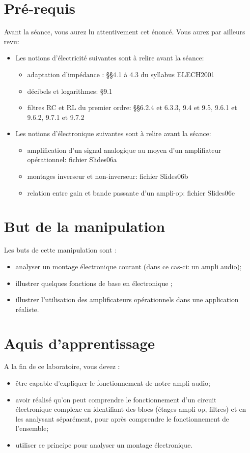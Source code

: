 \section*{Pré-requis}
Avant la séance, vous aurez lu attentivement cet énoncé. Vous aurez par ailleurs revu:\\
\begin{itemize}
\item Les notions d’électricité suivantes sont à relire avant la séance:
	\begin{itemize}
    \item adaptation d’impédance : §§4.1 à 4.3 du syllabus ELECH2001
	\item décibels et logarithmes: §9.1
	\item filtres RC et RL du premier ordre: §§6.2.4 et 6.3.3, 9.4 et 9.5, 9.6.1 et 9.6.2, 9.7.1 et 9.7.2
	\end{itemize}

\item Les notions d’électronique suivantes sont à relire avant la séance:
	\begin{itemize}
    \item amplification d’un signal analogique au moyen d’un amplifiateur opérationnel: fichier Slides06a
	\item montages inverseur et non-inverseur: fichier Slides06b
	\item relation entre gain et bande passante d’un ampli-op: fichier Slides06e
    \end{itemize}
\end{itemize}

\section*{But de la manipulation}
Les buts de cette manipulation sont :\\
\begin{itemize}
	\item analyser un montage électronique courant (dans ce cas-ci: un ampli audio);
	\item illustrer quelques fonctions de base en électronique ;
	\item illustrer l'utilisation des amplificateurs opérationnels dans une application réaliste.
\end{itemize}

\section*{Aquis d'apprentissage}
A la fin de ce laboratoire, vous devez :\\
\begin{itemize}
\item être capable d'expliquer le fonctionnement de notre ampli audio;
\item avoir réalisé qu'on peut comprendre le fonctionnement d'un circuit électronique complexe en identifiant des blocs (étages ampli-op, filtres) et en les analysant séparément, pour après comprendre le fonctionnement de l'ensemble;
\item utiliser ce principe pour analyser un montage électronique.
\end{itemize}
